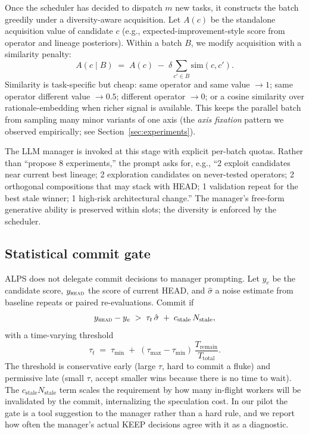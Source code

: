\documentclass{article}
\newcommand{\alps}{ALPS\xspace}
\newcommand{\HEAD}{\textsc{head}\xspace}
\begin{document}
Once the scheduler has decided to dispatch $m$ new tasks, it constructs the batch greedily under a diversity-aware acquisition. Let $A(c)$ be the standalone acquisition value of candidate $c$ (e.g., expected-improvement-style score from operator and lineage posteriors). Within a batch $B$, we modify acquisition with a similarity penalty:
\begin{equation}
  A(c \mid B) \;=\; A(c) \;-\; \delta \!\!\sum_{c' \in B}\! \mathrm{sim}(c, c').
  \label{eq:batch}
\end{equation}
Similarity is task-specific but cheap: same operator and same value $\to 1$; same operator different value $\to 0.5$; different operator $\to 0$; or a cosine similarity over rationale-embedding when richer signal is available. This keeps the parallel batch from sampling many minor variants of one axis (the \emph{axis fixation} pattern we observed empirically; see Section~\ref{sec:experiments}).

The LLM manager is invoked at this stage with explicit per-batch quotas. Rather than ``propose 8 experiments,'' the prompt asks for, e.g., ``2 exploit candidates near current best lineage; 2 exploration candidates on never-tested operators; 2 orthogonal compositions that may stack with HEAD; 1 validation repeat for the best stale winner; 1 high-risk architectural change.'' The manager's free-form generative ability is preserved within slots; the diversity is enforced by the scheduler.

\subsection{Statistical commit gate}
\label{sec:alps:gate}

\alps does not delegate commit decisions to manager prompting. Let $y_e$ be the candidate score, $y_{\HEAD}$ the score of current HEAD, and $\hat\sigma$ a noise estimate from baseline repeats or paired re-evaluations. Commit if
\begin{equation}
  y_{\HEAD} - y_e \;>\; \tau_t \, \hat\sigma \;+\; c_{\mathrm{stale}} \, N_{\mathrm{stale}},
  \label{eq:gate}
\end{equation}
with a time-varying threshold
\begin{equation}
  \tau_t \;=\; \tau_{\min} \;+\; (\tau_{\max} - \tau_{\min}) \, \frac{T_{\mathrm{remain}}}{T_{\mathrm{total}}}.
\end{equation}
The threshold is conservative early (large $\tau$, hard to commit a fluke) and permissive late (small $\tau$, accept smaller wins because there is no time to wait). The $c_{\mathrm{stale}} N_{\mathrm{stale}}$ term scales the requirement by how many in-flight workers will be invalidated by the commit, internalizing the speculation cost. In our pilot the gate is a tool suggestion to the manager rather than a hard rule, and we report how often the manager's actual KEEP decisions agree with it as a diagnostic.
\end{document}
